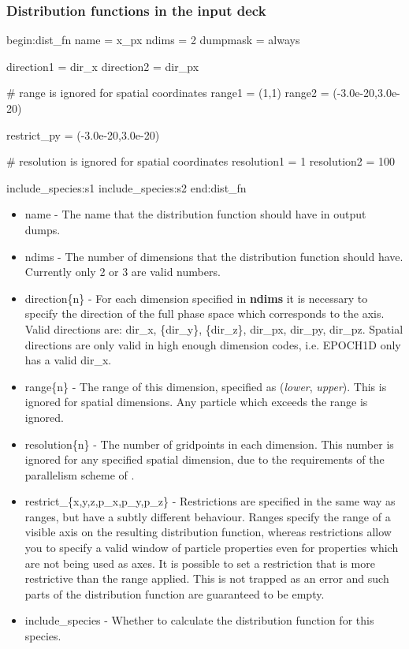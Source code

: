 \subsubsection{Distribution functions in the input deck}
\begin{boxverbatim}
begin:dist_fn
   name = x_px
   ndims = 2
   dumpmask = always

   direction1 = dir_x
   direction2 = dir_px

   # range is ignored for spatial coordinates
   range1 = (1,1)
   range2 = (-3.0e-20,3.0e-20)

   restrict_py = (-3.0e-20,3.0e-20)

   # resolution is ignored for spatial coordinates
   resolution1 = 1
   resolution2 = 100

   include_species:s1
   include_species:s2
end:dist_fn
\end{boxverbatim}
\begin{itemize}
\item name - The name that the distribution function should have in output
  dumps.
\item ndims - The number of dimensions that the distribution function should
  have. Currently only 2 or 3 are valid numbers.
\item direction\{n\} - For each dimension specified in {\bf ndims} it is
  necessary to specify the direction of the full phase space which corresponds
  to the axis. Valid directions are: dir\_x, \{dir\_y\}, \{dir\_z\}, dir\_px,
  dir\_py, dir\_pz. Spatial directions are only valid in high enough dimension
  codes, i.e. EPOCH1D only has a valid dir\_x.
\item range\{n\} - The range of this dimension, specified as ({\it lower},{\it
    upper}). This is ignored for spatial dimensions. Any particle which exceeds
  the range is ignored.
\item resolution\{n\} - The number of gridpoints in each dimension. This
  number is ignored for any specified spatial dimension, due to the
  requirements of the parallelism scheme of {\EPOCH}.
\item restrict\_\{x,y,z,p\_x,p\_y,p\_z\} - Restrictions are specified in the
  same way as ranges, but have a subtly different behaviour. Ranges specify
  the range of a visible axis on the resulting distribution function, whereas
  restrictions allow you to specify a valid window of particle properties even
  for properties which are not being used as axes. It is possible to set a
  restriction that is more restrictive than the range applied. This is not
  trapped as an error and such parts of the distribution function are
  guaranteed to be empty.
\item include\_species - Whether to calculate the distribution function
  for this species.
\end{itemize}


